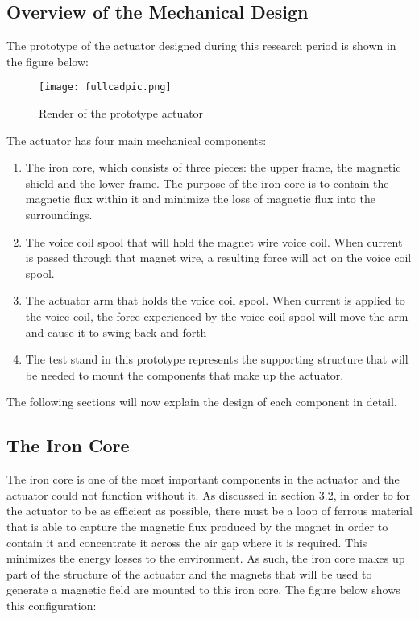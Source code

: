 \newpage
\subsection{Overview of the Mechanical Design}
The prototype of the actuator designed during this research period is shown in the figure below:

\begin{figure}[h!]
\centering
\texttt{[image: fullcadpic.png]}
\caption{Render of the prototype actuator}
\label{fig:fullcadpic}
\end{figure}

\noindent The actuator has four main mechanical components:
\begin{enumerate}
\item The iron core, which consists of three pieces: the upper frame, the magnetic shield and the lower frame. The purpose of the iron core is to contain the magnetic flux within it and minimize the loss of magnetic flux into the surroundings. 
\item The voice coil spool that will hold the magnet wire voice coil. When current is passed through that magnet wire, a resulting force will act on the voice coil spool.
\item The actuator arm that holds the voice coil spool. When current is applied to the voice coil, the force experienced by the voice coil spool will move the arm and cause it to swing back and forth
\item The test stand in this prototype represents the supporting structure that will be needed to mount the components that make up the actuator.
\end{enumerate}
%
The following sections will now explain the design of each component in detail.

\subsection{The Iron Core}

The iron core is one of the most important components in the actuator and the actuator could not function without it. As discussed in section 3.2, in order to for the actuator to be as efficient as possible, there must be a loop of ferrous material that is able to capture the magnetic flux produced by the magnet in order to contain it and concentrate it across the air gap where it is required. This minimizes the energy losses to the environment. As such, the iron core makes up part of the structure of the actuator and the magnets that will be used to generate a magnetic field are mounted to this iron core. The figure below shows this configuration:


